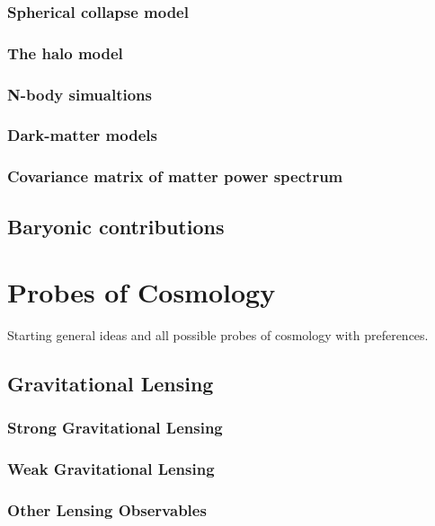 \subsubsection{Spherical collapse model}
\subsubsection{The halo model}
\subsubsection{N-body simualtions}
\subsubsection{Dark-matter models}
\subsubsection{Covariance matrix of matter power spectrum}
\subsection{Baryonic contributions}
\section{Probes of Cosmology}

Starting general ideas and all possible probes of cosmology with preferences.


\subsection{Gravitational Lensing}
\subsubsection{Strong Gravitational Lensing}
\subsubsection{Weak Gravitational Lensing}
\subsubsection{Other Lensing Observables}

